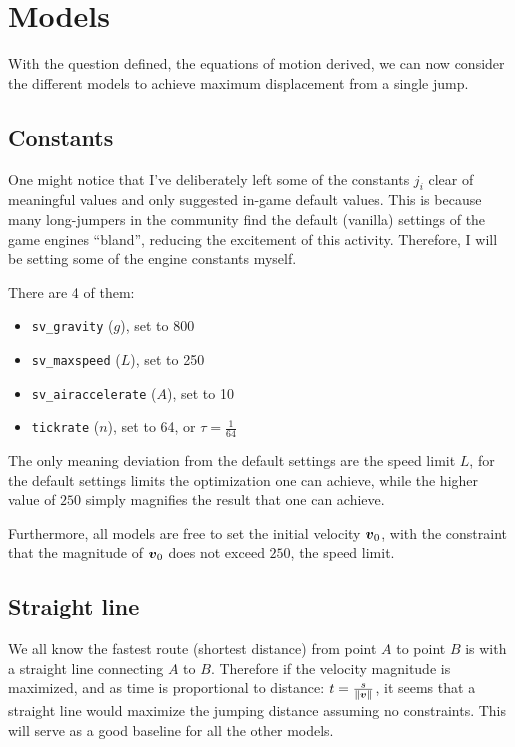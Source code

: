 \section{Models}
With the question defined, the equations of motion derived, we can now consider the different models to achieve maximum displacement from a single jump.

\subsection{Constants}
One might notice that I've deliberately left some of the constants $j_i$ clear of meaningful values and only suggested in-game default values. This is because many long-jumpers in the community find the default (vanilla) settings of the game engines ``bland'', reducing the excitement of this activity. Therefore, I will be setting some of the engine constants myself.

There are 4 of them:
\begin{itemize}
    \item \verb|sv_gravity| ($g$), set to 800
    \item \verb|sv_maxspeed| ($L$), set to 250
    \item \verb|sv_airaccelerate| ($A$), set to 10
    \item \verb|tickrate| ($n$), set to 64, or $\tau=\frac{1}{64}$
\end{itemize}

The only meaning deviation from the default settings are the speed limit $L$, for the default settings limits the optimization one can achieve, while the higher value of $250$ simply magnifies the result that one can achieve.

Furthermore, all models are free to set the initial velocity $\boldsymbol{v}_0$, with the constraint that the magnitude of $\boldsymbol{v}_0$ does not exceed $250$, the speed limit.

\subsection{Straight line}
We all know the fastest route (shortest distance) from point $A$ to point $B$ is with a straight line connecting $A$ to $B$. Therefore if the velocity magnitude is maximized, and as time is proportional to distance: $t = \frac{s}{\|\boldsymbol{v}\|}$, it seems that a straight line would maximize the jumping distance assuming no constraints. This will serve as a good baseline for all the other models.

